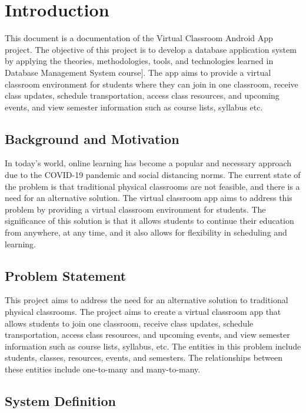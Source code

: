 
\section{Introduction}\label{sec:introduction}
This document is a documentation of the Virtual Classroom Android App project. The objective of this project is to develop a database application system by applying the theories, methodologies, tools, and technologies learned in Database Management System course]. The app aims to provide a virtual classroom environment for students where they can join in one classroom,
receive class updates, schedule transportation, access class resources, and upcoming events, and view semester information such as course lists, syllabus etc.  


\subsection{Background and Motivation}\label{subsec:bm}

In today's world, online learning has become a popular and necessary approach due to the  COVID-19 pandemic and social distancing norms. The current state of the problem is that traditional physical classrooms are not feasible, and there is a need for an alternative solution. The virtual classroom app aims to address this problem by providing a virtual classroom environment for students. The significance of this solution is that it allows students to continue their education from anywhere, at any time, and it also allows for flexibility in scheduling and learning.

\subsection{Problem Statement}\label{subsec:ps} 
This project aims to address the need for an alternative solution to traditional physical classrooms. The project aims to create a virtual classroom app that allows students to join one classroom, receive class updates, schedule transportation, access class resources, and upcoming events, and view semester information such as course lists, syllabus, etc. The entities in this problem include students, classes, resources, events, and semesters. The relationships between these entities include one-to-many and many-to-many.


\subsection{System Definition}\label{subsec:sd} 

